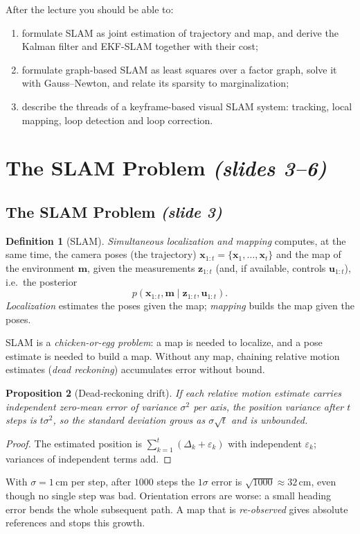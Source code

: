 \documentclass[11pt,a4paper]{article}
\newcommand{\slr}[1]{\texorpdfstring{\emph{(slides #1)}}{(slides #1)}}
\newcommand{\slrs}[1]{\texorpdfstring{\emph{(slide #1)}}{(slide #1)}}
\newcommand{\bx}{\bm{x}}
\newcommand{\bz}{\bm{z}}
\newcommand{\bu}{\mathbf{u}}
\theoremstyle{definition}
\newtheorem{definition}{Definition}[section]
\theoremstyle{plain}
\newtheorem{proposition}[definition]{Proposition}
\theoremstyle{remark}
\begin{document}
After the lecture you should be able to:
\begin{enumerate}[nosep]
\item formulate SLAM as joint estimation of trajectory and map, and derive the Kalman filter and EKF-SLAM together with their cost;
\item formulate graph-based SLAM as least squares over a factor graph, solve it with Gauss--Newton, and relate its sparsity to marginalization;
\item describe the threads of a keyframe-based visual SLAM system: tracking, local mapping, loop detection and loop correction.
\end{enumerate}

\section{The SLAM Problem \slr{3--6}}
\subsection{The SLAM Problem \slrs{3}}

\begin{definition}[SLAM]\label{def:slam}
\emph{Simultaneous localization and mapping} computes, at the same time, the camera poses (the trajectory) $\bx_{1:t}=\{\bx_1,\dots,\bx_t\}$ and the map of the environment $\mathbf{m}$, given the measurements $\bz_{1:t}$ (and, if available, controls $\bu_{1:t}$), i.e.\ the posterior
\[
p(\bx_{1:t},\mathbf{m}\mid \bz_{1:t},\bu_{1:t}).
\]
\emph{Localization} estimates the poses given the map; \emph{mapping} builds the map given the poses.
\end{definition}

SLAM is a \emph{chicken-or-egg problem}: a map is needed to localize, and a pose estimate is needed to build a map. Without any map, chaining relative motion estimates (\emph{dead reckoning}) accumulates error without bound.

\begin{proposition}[Dead-reckoning drift]\label{prop:drift}
If each relative motion estimate carries independent zero-mean error of variance $\sigma^2$ per axis, the position variance after $t$ steps is $t\sigma^2$, so the standard deviation grows as $\sigma\sqrt t$ and is unbounded.
\end{proposition}
\begin{proof}
The estimated position is $\sum_{k=1}^t(\Delta_k+\varepsilon_k)$ with independent $\varepsilon_k$; variances of independent terms add. \qedhere
\end{proof}
\begin{intuition}
With $\sigma=1$\,cm per step, after $1000$ steps the $1\sigma$ error is $\sqrt{1000}\approx 32$\,cm, even though no single step was bad. Orientation errors are worse: a small heading error bends the whole subsequent path. A map that is \emph{re-observed} gives absolute references and stops this growth.
\end{intuition}
\end{document}

